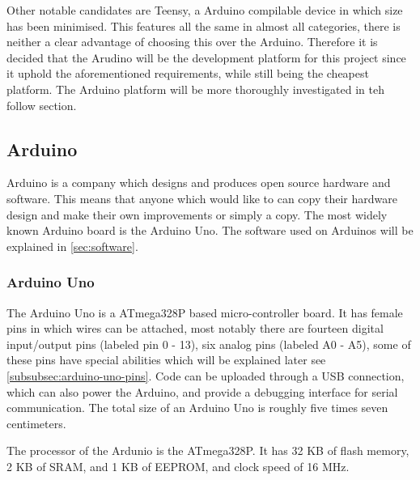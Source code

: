 Other notable candidates are Teensy, a Arduino compilable device in which size has been minimised.
This features all the same in almost all categories, there is neither a clear advantage of choosing this over the Arduino. 
Therefore it is decided that the Arudino will be the development platform for this project since it uphold the aforementioned requirements, while still being the cheapest platform.
The Arduino platform will be more thoroughly investigated in teh follow section.

\subsection{Arduino}
Arduino is a company which designs and produces open source hardware and software.
This means that anyone which would like to can copy their hardware design and make their own improvements or simply a copy.
The most widely known Arduino board is the Arduino Uno.
The software used on Arduinos will be explained in \ref{sec:software}.

\subsubsection{Arduino Uno}
The Arduino Uno is a ATmega328P based micro-controller board.
It has female pins in which wires can be attached, most notably there are fourteen digital input/output pins (labeled pin 0 - 13), six analog pins (labeled A0 - A5), some of these pins have special abilities which will be explained later see \ref{subsubsec:arduino-uno-pins}.
Code can be uploaded through a USB connection, which can also power the Arduino, and provide a debugging interface for serial communication.
The total size of an Arduino Uno is roughly five times seven centimeters. 

The processor of the Ardunio is the ATmega328P.
It has 32 KB of flash memory, 2 KB of SRAM, and 1 KB of EEPROM, and clock speed of 16 MHz.
